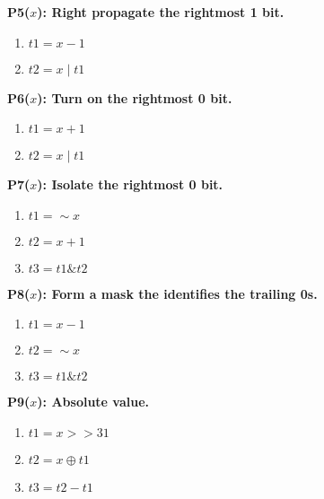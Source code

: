 \begin{figure}
\begin{multicols}{4}
   \vspace{12pt}
   
   \begin{minipage}{.2\textwidth}
   \bf{P5}($x$): Right propagate the rightmost 1 bit.
   \begin{enumerate}
    \item $t1 = x - 1$
    \item $t2 = x \mid t1$
   \end{enumerate}
   \end{minipage}

   \vspace{12pt}
   
   \begin{minipage}{.2\textwidth}
   \bf{P6}($x$): Turn on the rightmost 0 bit.
   \begin{enumerate}
    \item $t1 = x + 1$
    \item $t2 = x \mid t1$
   \end{enumerate}
   \end{minipage}
      \vspace{12pt}
   
   \begin{minipage}{.2\textwidth}
   \bf{P7}($x$): Isolate the rightmost 0 bit.
   \begin{enumerate}
    \item $t1 = \sim x$
    \item $t2 = x + 1$
    \item $t3 = t1 \& t2$
   \end{enumerate}
   \end{minipage}
   \vspace{12pt}
   
   \begin{minipage}{.2\textwidth}
   \bf{P8}($x$): Form a mask the identifies the trailing 0s.
   \begin{enumerate}
    \item $t1 = x -1$
    \item $t2 = \sim x$
    \item $t3 = t1 \& t2$
   \end{enumerate}
   \end{minipage}
   \vspace{12pt}
   
   \begin{minipage}{.2\textwidth}
   \bf{P9}($x$): Absolute value.
   \begin{enumerate}
    \item $t1 = x >> 31$
    \item $t2 = x \oplus t1$
    \item $t3 = t2 - t1$
   \end{enumerate}
   \end{minipage}


\end{multicols}
\end{figure}
